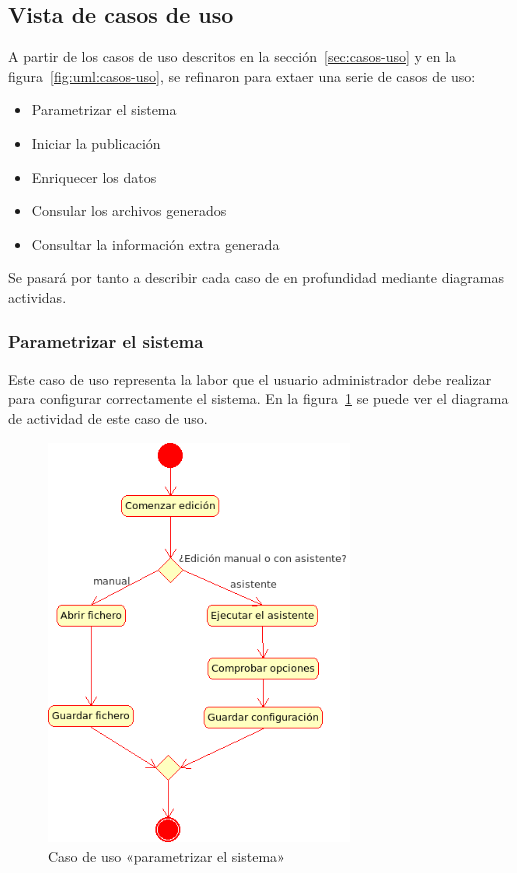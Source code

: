 
\subsection{Vista de casos de uso}

A partir de los casos de uso descritos en la sección~\ref{sec:casos-uso} y 
en la figura~\ref{fig:uml:casos-uso}, se refinaron para extaer una serie 
de casos de uso:

\begin{itemize}
 \item Parametrizar el sistema
 \item Iniciar la publicación
 \item Enriquecer los datos
 \item Consular los archivos generados
 \item Consultar la información extra generada
\end{itemize}

Se pasará por tanto a describir cada caso de en profundidad mediante diagramas
actividas.

\subsubsection{Parametrizar el sistema}

Este caso de uso representa la labor que el usuario administrador debe realizar 
para configurar correctamente el sistema. En la figura~\ref{fig:uml:parametrizar-sistema}
se puede ver el diagrama de actividad de este caso de uso.

\begin{figure}[ht]
 	\centering
	\includegraphics[width=8cm]{images/uml/casos-uso/parametrizar-sistema.png}
	\caption{Caso de uso «parametrizar el sistema»}
	\label{fig:uml:parametrizar-sistema}
\end{figure}

